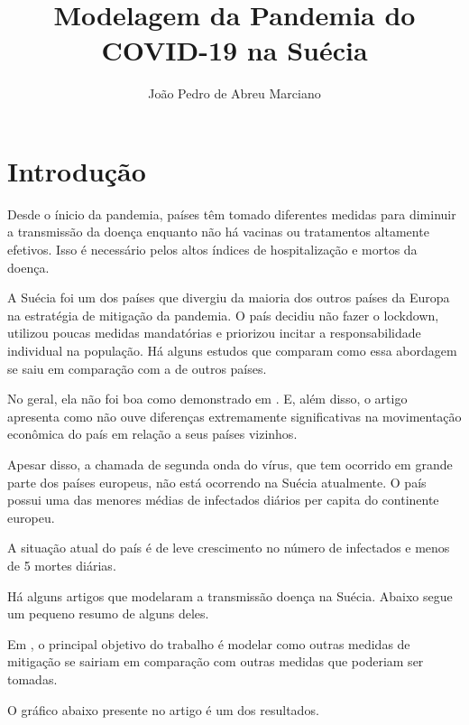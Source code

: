 \documentclass{article}
\title{Modelagem da Pandemia do COVID-19 na Suécia}
\author{João Pedro de Abreu Marciano }
\date{}
\begin{document}
\maketitle

\section{Introdução}
Desde o ínicio da pandemia, países têm tomado diferentes medidas para diminuir a transmissão da doença enquanto não há vacinas ou tratamentos altamente efetivos. Isso é necessário pelos altos índices de hospitalização e mortos da doença.

A Suécia foi um dos países que divergiu da maioria dos outros países da Europa na estratégia de mitigação da pandemia. O país decidiu não fazer o lockdown, utilizou poucas medidas mandatórias e priorizou incitar a responsabilidade individual na população. Há alguns estudos que comparam como essa abordagem se saiu em comparação com a de outros países. 

No geral, ela não foi boa como demonstrado em \citep{managing}. E, além disso, o artigo \citep{pandemicshutdown} apresenta como não ouve diferenças extremamente significativas na movimentação econômica do país em relação a seus países vizinhos.

Apesar disso, a chamada de segunda onda do vírus, que tem ocorrido em grande parte dos países europeus, não está ocorrendo na Suécia atualmente. O país possui uma das menores médias de infectados diários per capita do continente europeu.

A situação atual do país é de leve crescimento no número de infectados e menos de 5 mortes diárias.

Há alguns artigos que modelaram a transmissão doença na Suécia. Abaixo segue um pequeno resumo de alguns deles.

Em \citep{managing}, o principal objetivo do trabalho é modelar como outras medidas de mitigação se sairiam em comparação com outras medidas que poderiam ser tomadas.

O gráfico abaixo presente no artigo é um dos resultados.
\end{document}
